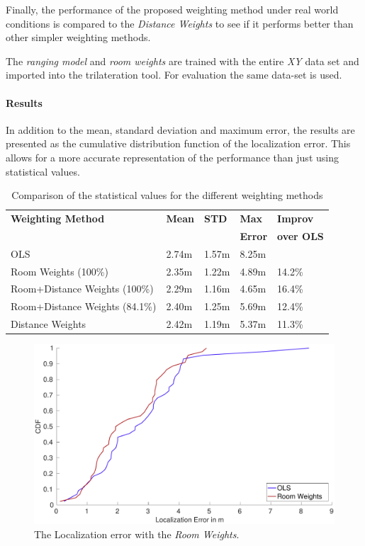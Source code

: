 Finally, the performance of the proposed weighting method under real world conditions is compared to the \emph{Distance Weights} to see if it performs better than other simpler weighting methods.

The \emph{ranging model} and \emph{room weights} are trained with the entire \emph{XY} data set and imported into the trilateration tool. For evaluation the same data-set is used.

\paragraph{Results}
In addition to the mean, standard deviation and maximum error, the results are presented as the cumulative distribution function of the localization error. This allows for a more accurate representation of the performance than just using statistical values.

\begin{table}[hb]
\centering
\begin{tabular}{l l l l l}
\toprule
\textbf{Weighting Method}&\textbf{Mean}&\textbf{STD}&\textbf{Max}&\textbf{Improv}\\
&&\textbf{}&\textbf{Error}&\textbf{over OLS}\\
\midrule
OLS&2.74m&1.57m&8.25m&\\
Room Weights (100\%)&2.35m&1.22m&4.89m&14.2\%\\
Room+Distance Weights (100\%)&2.29m&1.16m&4.65m&16.4\%\\
Room+Distance Weights (84.1\%)&2.40m&1.25m&5.69m&12.4\%\\
Distance Weights&2.42m&1.19m&5.37m&11.3\%\\
\bottomrule
\end{tabular}
\caption[Weighting - statistical values]{Comparison of the statistical values for the different weighting methods}
\label{tab:WeightingStatisticalValues}
\end{table}

\begin{figure}[p]
\centering
\includegraphics[width=\textwidth]{Figures/WeightingCDF_RW}
\decoRule
\caption[CDF Room Weights method (best-case)]{The Localization error with the \emph{Room Weights}.}
\label{fig:WeightingCDFRoom}
\end{figure}

